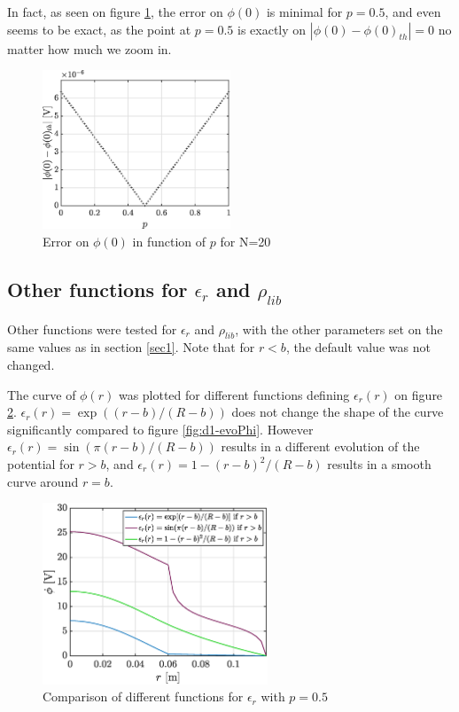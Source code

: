 \documentclass[a4paper,12pt,twoside]{article}
\begin{document}
      In fact, as seen on figure \ref{econv}, the error on $\phi(0)$ is minimal for $p=0.5$, and even seems to be exact, as the point at $p=0.5$ is exactly on $|\phi(0)-\phi(0)_{th}|=0$ no matter how much we zoom in.
      \begin{figure}[h]
      \centering
       \includegraphics[width=0.5\textwidth]{graphs/e_conv.eps}
       \caption{Error on $\phi(0)$ in function of $p$ for N=20}
       \label{econv}
      \end{figure}
      
      
      \subsection{Other functions for $\epsilon_r$ and $\rho_{lib}$}
      
      Other functions were tested for $\epsilon_r$ and $\rho_{lib}$, with the other parameters set on the same values as in section \ref{sec1}. Note that for $r<b$, the default value was not changed.
      
      The curve of $\phi(r)$ was plotted for different functions defining $\epsilon_r(r)$ on figure \ref{eepsr}. $\epsilon_r(r)=\exp((r-b)/(R-b))$ does not change the shape of the curve significantly compared to figure \ref{fig:d1-evoPhi}. However $\epsilon_r(r)=\sin(\pi(r-b)/(R-b))$ results in a different evolution of the potential for $r>b$, and $\epsilon_r(r)=1-(r-b)^2/(R-b)$ results in a smooth curve around $r=b$.

      \begin{figure}[h]
      \centering
       \includegraphics[width=0.6\textwidth]{graphs/eepsr.eps}
       \caption{Comparison of different functions for $\epsilon_r$ with $p=0.5$}
       \label{eepsr}
      \end{figure}
\end{document}
